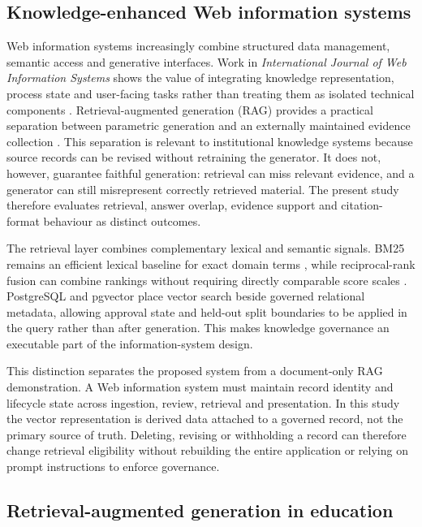 \subsection{Knowledge-enhanced Web information systems}

Web information systems increasingly combine structured data management, semantic access and generative interfaces. Work in \emph{International Journal of Web Information Systems} shows the value of integrating knowledge representation, process state and user-facing tasks rather than treating them as isolated technical components \citep{hubscher2021knowledge}. Retrieval-augmented generation (RAG) provides a practical separation between parametric generation and an externally maintained evidence collection \citep{lewis2020rag}. This separation is relevant to institutional knowledge systems because source records can be revised without retraining the generator. It does not, however, guarantee faithful generation: retrieval can miss relevant evidence, and a generator can still misrepresent correctly retrieved material. The present study therefore evaluates retrieval, answer overlap, evidence support and citation-format behaviour as distinct outcomes.

The retrieval layer combines complementary lexical and semantic signals. BM25 remains an efficient lexical baseline for exact domain terms \citep{robertson2009bm25}, while reciprocal-rank fusion can combine rankings without requiring directly comparable score scales \citep{cormack2009rrf}. PostgreSQL and pgvector place vector search beside governed relational metadata, allowing approval state and held-out split boundaries to be applied in the query rather than after generation. This makes knowledge governance an executable part of the information-system design.

This distinction separates the proposed system from a document-only RAG demonstration. A Web information system must maintain record identity and lifecycle state across ingestion, review, retrieval and presentation. In this study the vector representation is derived data attached to a governed record, not the primary source of truth. Deleting, revising or withholding a record can therefore change retrieval eligibility without rebuilding the entire application or relying on prompt instructions to enforce governance.

\subsection{Retrieval-augmented generation in education}

